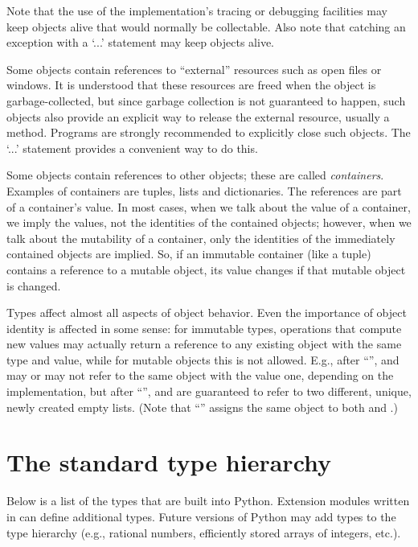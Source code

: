 Note that the use of the implementation's tracing or debugging
facilities may keep objects alive that would normally be collectable.
Also note that catching an exception with a
`...' statement may keep objects alive.

Some objects contain references to ``external'' resources such as open
files or windows.  It is understood that these resources are freed
when the object is garbage-collected, but since garbage collection is
not guaranteed to happen, such objects also provide an explicit way to
release the external resource, usually a  method.
Programs are strongly recommended to explicitly close such
objects.
The `...' statement provides a convenient way
to do this.

Some objects contain references to other objects; these are called
\emph{containers}.  Examples of containers are tuples, lists and
dictionaries.  The references are part of a container's value.  In
most cases, when we talk about the value of a container, we imply the
values, not the identities of the contained objects; however, when we
talk about the mutability of a container, only the identities of
the immediately contained objects are implied.  So, if an immutable
container (like a tuple)
contains a reference to a mutable object, its value changes
if that mutable object is changed.

Types affect almost all aspects of object behavior.  Even the importance
of object identity is affected in some sense: for immutable types,
operations that compute new values may actually return a reference to
any existing object with the same type and value, while for mutable
objects this is not allowed.  E.g., after
``'',
 and  may or may not refer to the same object with the
value one, depending on the implementation, but after
``'',  and 
are guaranteed to refer to two different, unique, newly created empty
lists.
(Note that ``'' assigns the same object to both
 and .)

\section{The standard type hierarchy} \label{types}

Below is a list of the types that are built into Python.  Extension
modules written in \C{} can define additional types.  Future versions of
Python may add types to the type hierarchy (e.g., rational
numbers, efficiently stored arrays of integers, etc.).

